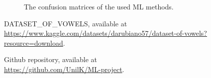 \documentclass[letterpaper,12pt]{article}
\begin{document}
\begin{figure}[!h]
    \caption{The confusion matrices of the used ML methods.}
    \label{fig:figconfusion}
\end{figure}
\begin{thebibliography}{99}
 DATASET\_OF\_VOWELS, available at \\ \href{https://www.kaggle.com/datasets/darubiano57/dataset-of-vowels?resource=download}{https://www.kaggle.com/datasets/darubiano57/dataset-of-vowels?resource=download}.

 Github repository, available at \\\href{https://github.com/UnilK/ML-project}{https://github.com/UnilK/ML-project}.
\end{thebibliography}
\end{document}
